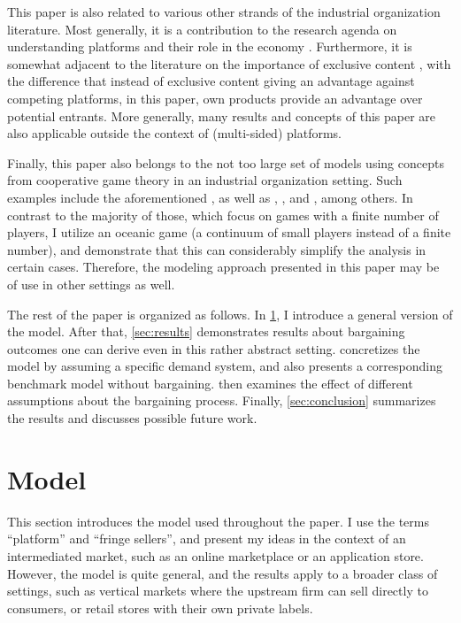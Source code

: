 \documentclass[a4paper]{article}
\begin{document}
This paper is also related to various other strands of the industrial organization literature.
Most generally, it is a contribution to the research agenda on understanding platforms and their role in the economy \parencite[e.g.][]{rochet2003platform,hagiu2004optimal,armstrong2006competition,evans2011platform,lee2014competing}.
Furthermore, it is somewhat adjacent to the literature on the importance of exclusive content \parencite[e.g.][]{hagiu2011exclusivity,lee2013vertical,dou2014sell,weeds2016tv}, with the difference that instead of exclusive content giving an advantage against competing platforms, in this paper, own products provide an advantage over potential entrants.
More generally, many results and concepts of this paper are also applicable outside the context of (multi-sided) platforms.

Finally, this paper also belongs to the not too large set of models using concepts from cooperative game theory in an industrial organization setting.
Such examples include the aforementioned \textcite{montez2007downstream}, as well as \textcite{hart1990property}, \textcite{levy1997individual}, \textcite{inderst2003bargaining} and \textcite{brugemann2019intra}, among others.
In contrast to the majority of those, which focus on games with a finite number of players, I utilize an oceanic game (a continuum of small players instead of a finite number), and demonstrate that this can considerably simplify the analysis in certain cases.
Therefore, the modeling approach presented in this paper may be of use in other settings as well.

The rest of the paper is organized as follows.
In \cref{sec:model}, I introduce a general version of the model.
After that, \cref{sec:results} demonstrates results about bargaining outcomes one can derive even in this rather abstract setting.
 concretizes the model by assuming a specific demand system, and also presents a corresponding benchmark model without bargaining.
 then examines the effect of different assumptions about the bargaining process.
Finally, \cref{sec:conclusion} summarizes the results and discusses possible future work.


\section{Model}
\label{sec:model}

This section introduces the model used throughout the paper.
I use the terms ``platform'' and ``fringe sellers'', and present my ideas in the context of an intermediated market, such as an online marketplace or an application store.
However, the model is quite general, and the results apply to a broader class of settings, such as vertical markets where the upstream firm can sell directly to consumers, or retail stores with their own private labels.
\end{document}
